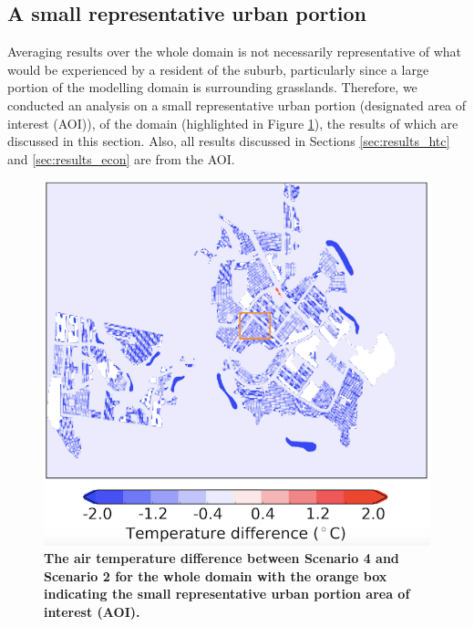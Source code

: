 \documentclass[final,3p,times,authoryear]{elsarticle}
\begin{document}
\subsection{A small representative urban portion}\label{sec:result_rep_urban}
Averaging results over the whole domain is not necessarily representative of what would be experienced by a resident of the suburb, particularly since a large portion of the modelling domain is surrounding grasslands. Therefore, we conducted an analysis on a small representative urban portion (designated area of interest (AOI)), of the domain (highlighted in Figure \ref{fig:temp_diff_repre}), the results of which are discussed in this section. Also, all results discussed in Sections \ref{sec:results_htc} and \ref{sec:results_econ} are from the AOI.

\begin{figure}[!htbp]
\centering   
\includegraphics[scale=0.40]{images/fig2}
\caption{\bf The air temperature difference between Scenario 4 and Scenario 2 for the whole domain with the orange box indicating the small representative urban portion area of interest (AOI).}    
 \label{fig:temp_diff_repre} 
\end{figure}
\end{document}
